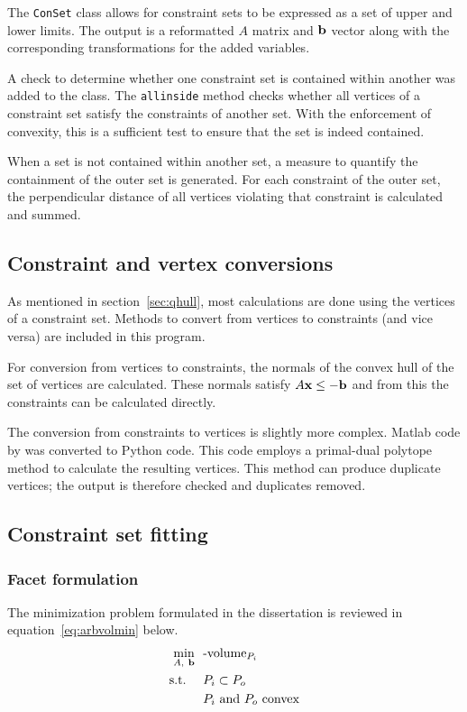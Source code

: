 The \texttt{ConSet} class allows for constraint sets to be expressed as a set of upper and lower limits.
The output is a reformatted $A$ matrix and ${\bf {b}}$ vector along with the corresponding transformations for the added variables.

A check to determine whether one constraint set is contained within another was added to the class.
The \texttt{allinside} method checks whether all vertices of a constraint set satisfy the constraints of another set.
With the enforcement of convexity, this is a sufficient test to ensure that the set is indeed contained.

When a set is not contained within another set, a measure to quantify the containment of the outer set is generated.
For each constraint of the outer set, the perpendicular distance of all vertices violating that constraint is calculated and summed.

\subsection{Constraint and vertex conversions}\label{sec:con2vert}
As mentioned in section~\ref{sec:qhull}, most calculations are done using the vertices of a constraint set.
Methods to convert from vertices to constraints (and vice versa) are included in this program.

For conversion from vertices to constraints, the normals of the convex hull of the set of vertices are calculated.
These normals satisfy $A{\bf {x}} \leq -{\bf {b}}$ \citep{qhulldocs} and from this the constraints can be calculated directly.

The conversion from constraints to vertices is slightly more complex.
Matlab code by \citet{con2vert} was converted to Python code.
This code employs a primal-dual polytope method to calculate the resulting vertices.
This method can produce duplicate vertices; the output is therefore checked and duplicates removed.

\subsection{Constraint set fitting}\label{sec:confit}
\subsubsection{Facet formulation}
The minimization problem formulated in the dissertation is reviewed in equation~\ref{eq:arbvolmin} below.
\begin{align}
  \label{eq:arbvolmin}
    \min_{A,~{\bf {b}}}~~&\text{-volume}_{P_i}\\
    \text{s.t.}~~~~ &P_i \subset P_o \notag \\
                    &P_i \text{~and~} P_o \text{~convex} \notag
\end{align}

